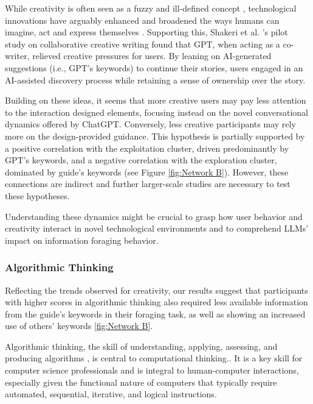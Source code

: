 \documentclass[sn-mathphys, Numbered]{sn-jnl}%
\theoremstyle{thmstyleone}%
\theoremstyle{thmstyletwo}%
\theoremstyle{thmstylethree}%
\begin{document}
While creativity is often seen as a fuzzy and ill-defined concept \parencite{mishra_rethinking_2012, henriksen_creativity_2018}, technological innovations have arguably enhanced and broadened the ways humans can imagine, act and express themselves \parencite{zhao_world_2012, iste_ct_2015}. Supporting this, Shakeri et al. \parencite*{shakeri_saga_2021}'s pilot study on collaborative creative writing found that GPT, when acting as a co-writer, relieved creative pressures for users. By leaning on AI-generated suggestions (i.e., GPT's keywords) to continue their stories, users engaged in an AI-assisted discovery process while retaining a sense of ownership over the story.

Building on these ideas, it seems that more creative users may pay less attention to the interaction designed elements, focusing instead on the novel conversational dynamics offered by ChatGPT. Conversely, less creative participants may rely more on the design-provided guidance. This hypothesis is partially supported by a positive correlation with the exploitation cluster, driven predominantly by GPT's keywords, and a negative correlation with the exploration cluster, dominated by guide's keywords (see Figure \ref{fig:Network B}). However, these connections are indirect and further larger-scale studies are necessary to test these hypotheses. 

Understanding these dynamics might be crucial to grasp how user behavior and creativity interact in novel technological environments and to comprehend LLMs' impact on information foraging behavior. 

\subsubsection*{Algorithmic Thinking}

Reflecting the trends observed for creativity, our results suggest that participants with higher scores in algorithmic thinking also required less available information from the guide's keywords in their foraging task, as well as showing an increased use of others' keywords \ref{fig:Network B}. 

Algorithmic thinking, the skill of understanding, applying, assessing, and producing algorithms \parencite{brown2015introduction}, is central to computational thinking.. It is a key skill for computer science professionals \parencite{wing_computational_2006, angeli_computational_2020, cansu_overview_2019} and is integral to human-computer interactions, especially given the functional nature of computers that typically require automated, sequential, iterative, and logical instructions.
\end{document}
